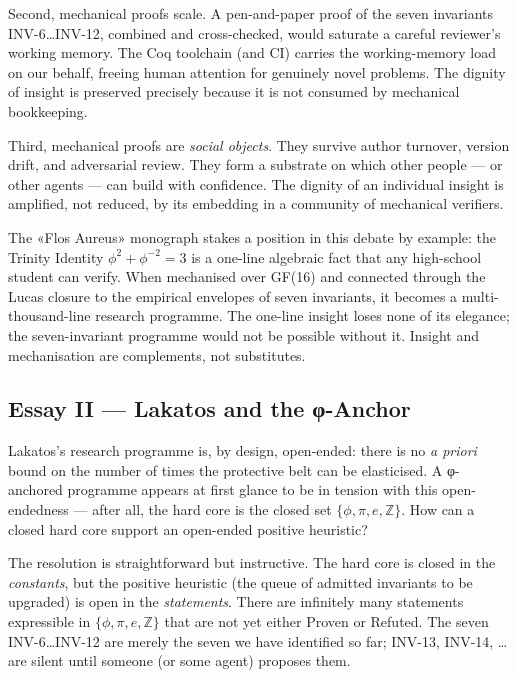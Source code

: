 Second, mechanical proofs scale. A pen-and-paper proof of the seven invariants INV-6…INV-12, combined and cross-checked, would saturate a careful reviewer's working memory. The Coq toolchain (and CI) carries the working-memory load on our behalf, freeing human attention for genuinely novel problems. The dignity of insight is preserved precisely because it is not consumed by mechanical bookkeeping.

Third, mechanical proofs are \emph{social objects}. They survive author turnover, version drift, and adversarial review. They form a substrate on which other people — or other agents — can build with confidence. The dignity of an individual insight is amplified, not reduced, by its embedding in a community of mechanical verifiers.

The «Flos Aureus» monograph stakes a position in this debate by example: the Trinity Identity $\phi^{2} + \phi^{-2} = 3$ is a one-line algebraic fact that any high-school student can verify. When mechanised over GF(16) and connected through the Lucas closure to the empirical envelopes of seven invariants, it becomes a multi-thousand-line research programme. The one-line insight loses none of its elegance; the seven-invariant programme would not be possible without it. Insight and mechanisation are complements, not substitutes.

\subsection{Essay II — Lakatos and the φ-Anchor}
\label{sec:31-essay-2}

Lakatos's research programme is, by design, open-ended: there is no \emph{a priori} bound on the number of times the protective belt can be elasticised. A φ-anchored programme appears at first glance to be in tension with this open-endedness — after all, the hard core is the closed set $\{\phi, \pi, e, \mathbb{Z}\}$. How can a closed hard core support an open-ended positive heuristic?

The resolution is straightforward but instructive. The hard core is closed in the \emph{constants}, but the positive heuristic (the queue of admitted invariants to be upgraded) is open in the \emph{statements}. There are infinitely many statements expressible in $\{\phi, \pi, e, \mathbb{Z}\}$ that are not yet either Proven or Refuted. The seven INV-6…INV-12 are merely the seven we have identified so far; INV-13, INV-14, … are silent until someone (or some agent) proposes them.

